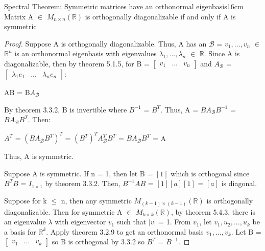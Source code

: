     \newpage



    \begin{wtheorem}{Spectral Theorem: Symmetric matrices have an
    orthonormal eigenbasis}{16cm}
        Matrix A $\in$ $M_{n \times n}(\mathbb{R})$ is orthogonally
        diagonalizable if and only if A is symmetric
    \end{wtheorem}

    \begin{proof}
        Suppose A is orthogonally diagonalizable.
        Thus, A has an $\mathcal{B}$ = $v_1,...,v_n$ $\in$ $\mathbb{R}^n$
        is an orthonormal eigenbasis with eigenvalues $\lambda_1,...,\lambda_n$
        $\in$ $\mathbb{R}$.
        Since A is diagonalizable, then by {\color{red} theorem 5.1.5},
        for B =
        $\begin{bmatrix}
            v_1 & ... & v_n
        \end{bmatrix}$ and $A_{\mathcal{B}}$ =
        $\begin{bmatrix}
            \lambda_1e_1 & ... & \lambda_ne_n
        \end{bmatrix}$:

        \hspace{0.5cm}
        AB = B$A_{\mathcal{B}}$

        By {\color{red} theorem 3.3.2}, B is invertible where $B^{-1}$ = $B^T$.
        Thus, A = $BA_{\mathcal{B}}B^{-1}$ = $BA_{\mathcal{B}}B^T$. Then:

        \hspace{0.5cm}
        $A^T$
        = $(BA_{\mathcal{B}}B^T)^T$
        = $(B^T)^T A_{\mathcal{B}}^T B^T$
        = $B A_{\mathcal{B}} B^T$
        = A

        Thus, A is symmetric.

        \vspace{0.3cm}

        Suppose A is symmetric.
        If n = 1, then let B = $[1]$ which is orthogonal since
        $B^TB$ = $I_{1 \times 1}$ by {\color{red} theorem 3.3.2}.
        Then, $B^{-1}AB$ = $[1][a][1]$ = $[a]$ is diagonal.

        Suppose for k $\leq$ n, then any symmetric
        $M_{(k-1) \times (k-1)}(\mathbb{R})$ is orthogonally diagonalizable.
        Then for symmetric A $\in$ $M_{k \times k}(\mathbb{R})$,
        by {\color{red} theorem 5.4.3}, there is an eigenvalue $\lambda$
        with eigenvector $v_1$ such that $|v|$ = 1.
        From $v_1$, let $v_1,u_2,...,u_k$ be a basis for $\mathbb{R}^k$.
        Apply {\color{red} theorem 3.2.9} to get an orthonormal basis
        $v_1,...,v_k$. Let B =
        $\begin{bmatrix}
            v_1 & ... & v_k
        \end{bmatrix}$ so B is orthogonal by {\color{red} 3.3.2}
        so $B^T$ = $B^{-1}$.
        

\end{proof}
